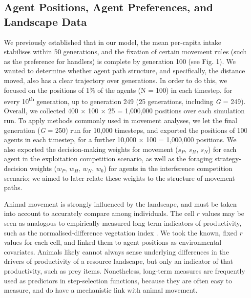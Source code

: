     \subsection*{Agent Positions, Agent Preferences, and Landscape Data}
    
    We previously established that in our model, the mean per-capita intake stabilises within 50 generations, and the fixation of certain movement rules (such as the preference for handlers) is complete by generation 100 (see Fig. 1).
    We wanted to determine whether agent path structure, and specifically, the distance moved, also has a clear trajectory over generations.
    In order to do this, we focused on the positions of 1\% of the agents (N = 100) in each timestep, for every 10\textsuperscript{th} generation, up to generation 249 (25 generations, including \textit{G} = 249).
    Overall, we collected 400 $\times$ 100 $\times$ 25 = 1,000,000 positions over each simulation run.
    To apply methods commonly used in movement analyses, we let the final generation (\textit{G} = 250) run for 10,000 timesteps, and exported the positions of 100 agents in each timestep, for a further 10,000 $\times$ 100 = 1,000,000 positions.
    We also exported the decision-making weights for movement ($s_P$, $s_H$, $s_N$) for each agent in the exploitation competition scenario, as well as the foraging strategy-decision weights ($w_P$, $w_H$, $w_N$, $w_0$) for agents in the interference competition scenario; we aimed to later relate these weights to the structure of movement paths.
    
    Animal movement is strongly influenced by the landscape, and must be taken into account to accurately compare among individuals.
    The cell $r$ values may be seen as analogous to empirically measured long-term indicators of productivity, such as the normalised-difference vegetation index \citep[NDVI;][]{pettorelli2011}.
    We took the known, fixed $r$ values for each cell, and linked them to agent positions as environmental covariates.
    Animals likely cannot always sense underlying differences in the drivers of productivity of a resource landscape, but only an indicator of that productivity, such as prey items.
    Nonetheless, long-term measures are frequently used as predictors in step-selection functions, because they are often easy to measure, and do have a mechanistic link with animal movement.
    
